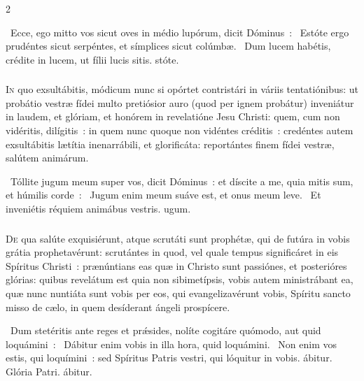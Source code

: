 \documentclass[9pt,twoside]{extarticle}
\begin{document}
\begin{multicols}{2}
{\begin{tightlist}{}
\item {}~Ecce, ego mitto vos sicut oves in médio lupórum, dicit Dóminus~: \textred{*}~Estóte ergo prudéntes sicut serpéntes, et símplices sicut colúmbæ. ~Dum lucem habétis, crédite in lucem, ut fílii lucis sitis. stóte.
\end{tightlist}

\subsubsection*{\center {}}
\lettrine{I}n quo exsultábitis, módicum nunc si opórtet contristári in váriis tentatiónibus:
ut probátio vestræ fídei multo pretiósior auro (quod per ignem probátur) inveniátur in laudem, et glóriam, et honórem in revelatióne Jesu Christi:
quem, cum non vidéritis, dilígitis~: in quem nunc quoque non vidéntes créditis~: credéntes autem exsultábitis lætítia inenarrábili, et glorificáta:
reportántes finem fídei vestræ, salútem animárum.

\begin{tightlist}{}
\item {}~Tóllite jugum meum super vos, dicit Dóminus~: et díscite a me, quia mitis sum, et húmilis corde~: \textred{*}~Jugum enim meum suáve est, et onus meum leve. ~Et inveniétis réquiem animábus vestris. ugum.
\end{tightlist}

\subsubsection*{\center {}}
\lettrine{D}e qua salúte exquisiérunt, atque scrutáti sunt prophétæ, qui de futúra in vobis grátia prophetavérunt:
scrutántes in quod, vel quale tempus significáret in eis Spíritus Christi~: prænúntians eas quæ in Christo sunt passiónes, et posterióres glórias:
quibus revelátum est quia non sibimetípsis, vobis autem ministrábant ea, quæ nunc nuntiáta sunt vobis per eos, qui evangelizavérunt vobis, Spíritu sancto misso de cælo, in quem desíderant ángeli prospícere.

\begin{tightlist}{}
\item {}~Dum stetéritis ante reges et prǽsides, nolíte cogitáre quómodo, aut quid loquámini~: \textred{*}~Dábitur enim vobis in illa hora, quid loquámini. ~Non enim vos estis, qui loquímini~: sed Spíritus Patris vestri, qui lóquitur in vobis. ábitur. Glória Patri. ábitur.
\end{tightlist}

}
\end{multicols}
\end{document}
